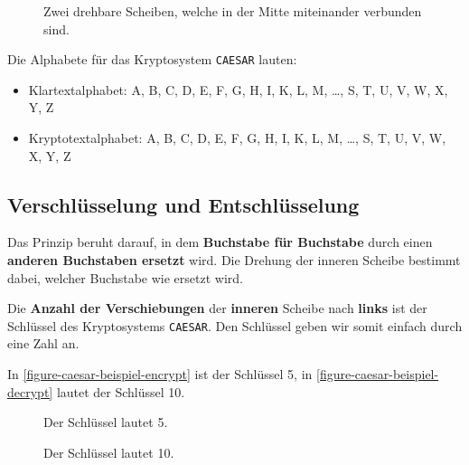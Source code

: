 \begin{figure}[htb]
\centering
{}
\caption{Zwei drehbare Scheiben, welche in der Mitte miteinander verbunden sind.}
\label{figure-caesar-beispiel}
\end{figure}

Die Alphabete für das Kryptosystem \texttt{CAESAR} lauten:

\begin{itemize}
\item Klartextalphabet: A, B, C, D, E, F, G, H, I, K, L, M, \dots , S, T, U, V, W, X, Y, Z
\item Kryptotextalphabet: A, B, C, D, E, F, G, H, I, K, L, M, \dots , S, T, U, V, W, X, Y, Z
\end{itemize}

\subsection{Verschlüsselung und Entschlüsselung}

Das Prinzip beruht darauf, in dem \textbf{Buchstabe für Buchstabe} durch einen \textbf{anderen Buchstaben ersetzt} wird. Die Drehung der inneren Scheibe bestimmt dabei, welcher Buchstabe wie ersetzt wird.

\begin{definition}
Die \textbf{Anzahl der Verschiebungen} der \textbf{inneren} Scheibe nach \textbf{links} ist der Schlüssel des Kryptosystems \texttt{CAESAR}. Den Schlüssel geben wir somit einfach durch eine Zahl an.
\end{definition}

\begin{example}
In \autoref{figure-caesar-beispiel-encrypt} ist der Schlüssel \num{5}, in \autoref{figure-caesar-beispiel-decrypt} lautet der Schlüssel \num{10}.
\end{example}

\begin{figure}[htb]
\begin{minipage}{0.45\textwidth}
\centering
{}
\caption{Der Schlüssel lautet \num{5}.}
\label{figure-caesar-beispiel-encrypt}
\end{minipage}
\hfill
\begin{minipage}{0.45\textwidth}
\centering
{}
\caption{Der Schlüssel lautet \num{10}.}
\label{figure-caesar-beispiel-decrypt}
\end{minipage}
\end{figure}

